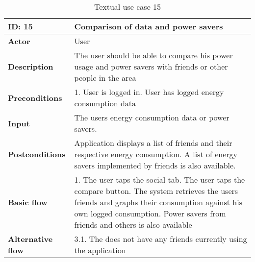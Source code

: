 \begin{table}[H]
\begin{tabular}{|l|p{11.7cm}|}
\hline
\textbf{ID: }15&\textbf{Comparison of data and power savers}
\\\hline
\textbf{Actor} &User
\\\hline
\textbf{Description}&
The user should be able to compare his power usage and power savers with friends or other people in the area\\\hline
\textbf{Preconditions}&
1. User is logged in\newline
2. User has logged energy consumption data\\\hline
\textbf{Input}&
The users energy consumption data or power savers.\\\hline
\textbf{Postconditions}& 
Application displays a list of friends and their respective energy consumption. A list of energy savers implemented by friends is also available. \\\hline
\textbf{Basic flow}&
1. The user taps the social tab\newline
2. The user taps the compare button\newline
3. The system retrieves the users friends and graphs their consumption against his own logged consumption\newline
4. Power savers from friends and others is also available
\\\hline
\textbf{Alternative flow}&
3.1. The does not have any friends currently using the application
\\\hline
\end{tabular}
\caption{Textual use case 15}
\end{table}
